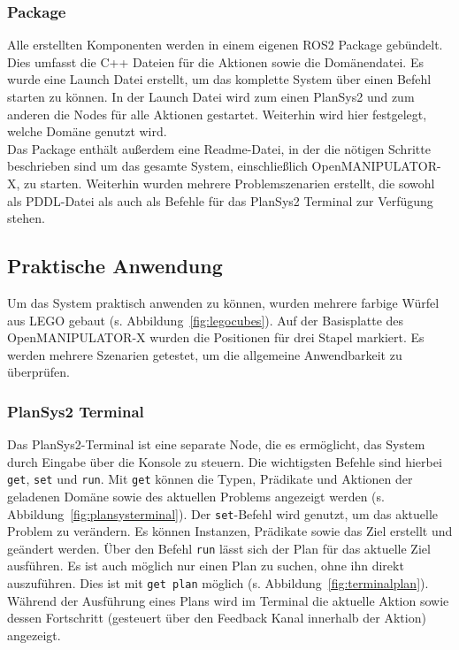 \subsubsection{Package}
Alle erstellten Komponenten werden in einem eigenen \ac{ROS2} Package gebündelt.
Dies umfasst die C++ Dateien für die Aktionen sowie die Domänendatei.
Es wurde eine Launch Datei erstellt, um das komplette System über einen Befehl starten zu können.
In der Launch Datei wird zum einen \ac{PlanSys2} und zum anderen die Nodes für alle Aktionen gestartet.
Weiterhin wird hier festgelegt, welche Domäne genutzt wird.\\
Das Package enthält außerdem eine Readme-Datei, in der die nötigen Schritte beschrieben sind um das gesamte System, einschließlich OpenMANIPULATOR-X, zu starten.
Weiterhin wurden mehrere Problemszenarien erstellt, die sowohl als \ac{PDDL}-Datei als auch als Befehle für das \ac{PlanSys2} Terminal zur Verfügung stehen.

\subsection{Praktische Anwendung}
Um das System praktisch anwenden zu können, wurden mehrere farbige Würfel aus LEGO gebaut (s. Abbildung~\ref{fig:legocubes}).
Auf der Basisplatte des OpenMANIPULATOR-X wurden die Positionen für drei Stapel markiert.
Es werden mehrere Szenarien getestet, um die allgemeine Anwendbarkeit zu überprüfen.
\subsubsection{PlanSys2 Terminal}
Das \ac{PlanSys2}-Terminal ist eine separate Node, die es ermöglicht, das System durch Eingabe über die Konsole zu steuern.
Die wichtigsten Befehle sind hierbei \verb|get|, \verb|set| und \verb|run|.
Mit \verb|get| können die Typen, Prädikate und Aktionen der geladenen Domäne sowie des aktuellen Problems angezeigt werden (s. Abbildung~\ref{fig:plansysterminal}).
Der \verb|set|-Befehl wird genutzt, um das aktuelle Problem zu verändern.
Es können Instanzen, Prädikate sowie das Ziel erstellt und geändert werden.
Über den Befehl \verb|run| lässt sich der Plan für das aktuelle Ziel ausführen.
Es ist auch möglich nur einen Plan zu suchen, ohne ihn direkt auszuführen.
Dies ist mit \verb|get plan| möglich (s. Abbildung~\ref{fig:terminalplan}).\\
Während der Ausführung eines Plans wird im Terminal die aktuelle Aktion sowie dessen Fortschritt (gesteuert über den Feedback Kanal innerhalb der Aktion) angezeigt.
